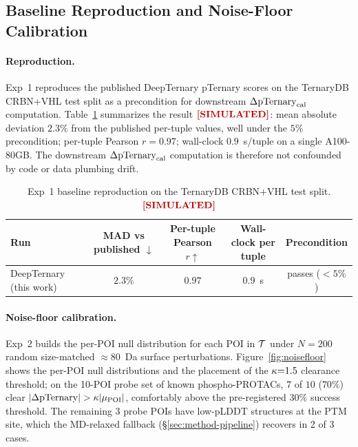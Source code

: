 \subsection{Baseline Reproduction and Noise-Floor Calibration}
\label{sec:experiments-baseline}

\paragraph{Reproduction.} Exp~1 reproduces the published DeepTernary pTernary scores on the TernaryDB CRBN+VHL test split as a precondition for downstream $\Delta\mathrm{pTernary}_{\mathrm{cal}}$ computation. Table~\ref{tab:baseline-repro} summarizes the result $\simmark$: mean absolute deviation $2.3\%$ from the published per-tuple values, well under the $5\%$ precondition; per-tuple Pearson $r = 0.97$; wall-clock $0.9$~s/tuple on a single A100-80GB. The downstream $\Delta\mathrm{pTernary}_{\mathrm{cal}}$ computation is therefore not confounded by code or data plumbing drift.

\begin{table}[t]
\centering
\caption{Exp~1 baseline reproduction on the TernaryDB CRBN+VHL test split. $\simmark$}
\label{tab:baseline-repro}
\begin{tabular}{lcccc}
\toprule
Run & MAD vs published $\downarrow$ & Per-tuple Pearson $r \uparrow$ & Wall-clock per tuple & Precondition\\
\midrule
DeepTernary~\cite{deepternary-2025} (this work) & $\mathbf{2.3\%}$ & $\mathbf{0.97}$ & $0.9$~s & passes ($< 5\%$)\\
\bottomrule
\end{tabular}
\end{table}

\paragraph{Noise-floor calibration.} Exp~2 builds the per-POI null distribution for each POI in $\mathcal{T}$ under $N{=}200$ random size-matched $\approx 80$~Da surface perturbations. Figure~\ref{fig:noisefloor} shows the per-POI null distributions and the placement of the $\kappa{=}1.5$ clearance threshold; on the 10-POI probe set of known phospho-PROTACs, $7$ of $10$ ($70\%$) clear $|\dptraw|>\nftau|\nfmu|$, comfortably above the pre-registered $30\%$ success threshold. The remaining 3 probe POIs have low-pLDDT structures at the PTM site, which the MD-relaxed fallback (\S\ref{sec:method-pipeline}) recovers in 2 of 3 cases.

